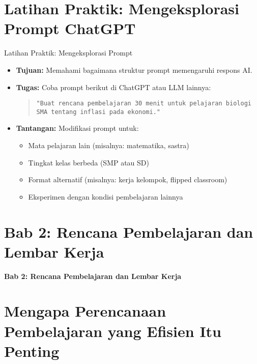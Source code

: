 \documentclass[aspectratio=169, table]{beamer}
\begin{document}
\section{Latihan Praktik: Mengeksplorasi Prompt ChatGPT}

\begin{frame}[fragile]{Latihan Praktik: Mengeksplorasi Prompt}
	\vspace{20pt}
	\begin{itemize}
		\item \textbf{Tujuan:} Memahami bagaimana struktur prompt memengaruhi respons AI.
		
		\item \textbf{Tugas:} Coba prompt berikut di ChatGPT atau LLM lainnya:
		\begin{quote}
					\vspace{5pt}
			\centering
			\texttt{"Buat rencana pembelajaran 30 menit untuk pelajaran biologi SMA tentang inflasi pada ekonomi."}
		\end{quote}
		
		\item \textbf{Tantangan:} Modifikasi prompt untuk:
		\begin{itemize}
			\item Mata pelajaran lain (misalnya: matematika, sastra)
			\item Tingkat kelas berbeda (SMP atau SD)
			\item Format alternatif (misalnya: kerja kelompok, flipped classroom)
			\item Eksperimen dengan kondisi pembelajaran lainnya
		\end{itemize}
	\end{itemize}
\end{frame}

\section{Bab 2: Rencana Pembelajaran dan Lembar Kerja}
\begin{frame}{\hfill}
	\centering
	\Huge{\textbf{Bab 2: Rencana Pembelajaran dan Lembar Kerja}}
\end{frame}

\section{Mengapa Perencanaan Pembelajaran yang Efisien Itu Penting}
\end{document}
